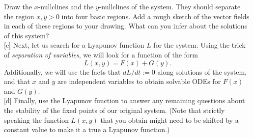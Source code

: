 \documentclass{article}
\begin{document}
\begin{enumerate}
[b] Draw the $x$-nullclines and the $y$-nullclines of the system. They should separate the region $x,y>0$ into four basic regions. Add a rough sketch of the vector fields in each of these regions to your drawing. What can you infer about the solutions of this system? \\

[c] Next, let us search for a Lyapunov function $L$ for the system. Using the trick of {\it separation of variables}, we will look for a function of the form
\begin{equation}
    L(x,y) = F(x) + G(y).
\end{equation}
Additionally, we will use the facts that $dL/dt := 0$ along solutions of the system, and that $x$ and $y$ are independent variables to obtain solvable ODEs for $F(x)$ and $G(y)$. \\

[d] Finally, use the Lyapunov function to answer any remaining questions about the stability of the fixed points of our original system. (Note that strictly speaking the function $L(x,y)$ that you obtain might need to be shifted by a constant value to make it a true a Lyapunov function.) 


\end{enumerate}
\end{document}
